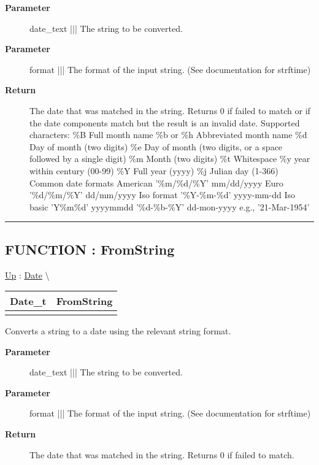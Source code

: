 \par
\begin{description}
\item [\textbf{Parameter}] date\_text ||| The string to be converted.
\item [\textbf{Parameter}] format ||| The format of the input string. (See documentation for strftime)
\item [\textbf{Return}] The date that was matched in the string. Returns 0 if failed to match or if the date components match but the result is an invalid date. Supported characters: \%B Full month name \%b or \%h Abbreviated month name \%d Day of month (two digits) \%e Day of month (two digits, or a space followed by a single digit) \%m Month (two digits) \%t Whitespace \%y year within century (00-99) \%Y Full year (yyyy) \%j Julian day (1-366) Common date formats American '\%m/\%d/\%Y' mm/dd/yyyy Euro '\%d/\%m/\%Y' dd/mm/yyyy Iso format '\%Y-\%m-\%d' yyyy-mm-dd Iso basic 'Y\%m\%d' yyyymmdd '\%d-\%b-\%Y' dd-mon-yyyy e.g., '21-Mar-1954'
\end{description}

\rule{\linewidth}{0.5pt}
\subsection*{FUNCTION : FromString}
\hypertarget{ecldoc:date.fromstring}{}
\hyperlink{ecldoc:Date}{Up} :
\hspace{0pt} \hyperlink{ecldoc:Date}{Date} \textbackslash 

{\renewcommand{\arraystretch}{1.5}
\begin{tabularx}{\textwidth}{|>{\raggedright\arraybackslash}l|X|}
\hline
\hspace{0pt}Date\_t & FromString \\
\hline
\multicolumn{2}{|>{\raggedright\arraybackslash}X|}{\hspace{0pt}(STRING date\_text, VARSTRING format)} \\
\hline
\end{tabularx}
}

\par
Converts a string to a date using the relevant string format.

\par
\begin{description}
\item [\textbf{Parameter}] date\_text ||| The string to be converted.
\item [\textbf{Parameter}] format ||| The format of the input string. (See documentation for strftime)
\item [\textbf{Return}] The date that was matched in the string. Returns 0 if failed to match.
\end{description}

